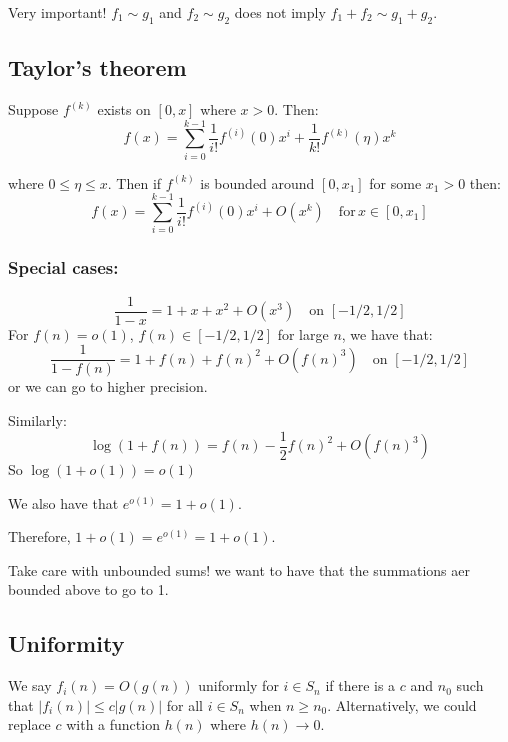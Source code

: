 \documentclass[]{article}
\theoremstyle{definition}
\numberwithin{theorem}{section}
\numberwithin{equation}{section}
\begin{document}
Very important! $f_1 \sim g_1$ and $f_2 \sim g_2$ does not imply $f_1 + f_2 \sim g_1 + g_2$. 
\subsection{Taylor's theorem}
Suppose $f^{(k)}$ exists on $[0, x]$ where $x > 0$. Then:
\begin{equation}
	f(x) = \sum_{i = 0}^{k - 1} \frac{1}{i!}f^{(i)}(0) x^i + \frac{1}{k!} f^{(k)}(\eta) x^k
\end{equation}

where $0 \leq \eta \leq x$. Then if $f^(k)$ is bounded around $[0, x_1]$ for some $x_1 > 0$ then:
\begin{equation}
	f(x) = \sum_{i = 0}^{k - 1} \frac{1}{i!}f^{(i)}(0) x^i + O(x^k) \quad \text{for} \, x \in [0, x_1]
\end{equation}

\subsubsection{Special cases:}

\begin{equation}
	\frac{1}{1-x} = 1 + x + x^2 + O(x^3) \quad \text{on } [-1/2, 1/2]
\end{equation}
For $f(n) = o(1)$, $f(n) \in [-1/2, 1/2]$ for large $n$, we have that:
\begin{equation}
	\frac{1}{1-f(n)} = 1 + f(n) + f(n)^2 + O(f(n)^3) \quad \text{on } [-1/2, 1/2]
\end{equation}
or we can go to higher precision. 

Similarly:
\begin{equation}
	\log( 1 + f(n)) = f(n) - \frac{1}{2} f(n)^2 + O(f(n)^3)
\end{equation}
So $\log(1 + o(1)) = o(1)$

We also have that $e^{o(1)} = 1 + o(1)$. 

Therefore, $1 + o(1) = e^{o(1)} = 1 + o(1)$. 

Take care with unbounded sums! we want to have that the summations aer bounded above to go to 1. 

\subsection{Uniformity}
We say $f_i(n) = O(g(n))$ uniformly for $i \in S_n$ if there is a $c$ and $n_0$ such that $|f_i(n)| \leq c |g(n)|$ for all $i \in S_n$ when $n \geq n_0$. 
Alternatively, we could replace $c$ with a function $h(n)$ where $h(n) \rightarrow 0$. 
\end{document}
